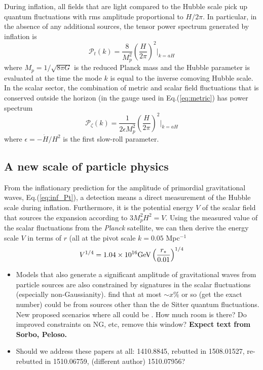 During inflation, all fields that are light compared to the Hubble scale pick up quantum fluctuations with rms amplitude proportional to $H/2\pi$. In particular, in the absence of any additional sources, the tensor power spectrum generated by inflation is 
\begin{equation}
\label{eq:inf_Pt}
\mathcal{P}_{t}(k)=\frac{8}{M_p^2}\left(\frac{H}{2\pi}\right)^2\big|_{k=aH}
\end{equation}
where $M_p=1/\sqrt{8\pi G}$ is the reduced Planck mass and the Hubble parameter is evaluated at the time the mode $k$ is equal to the inverse comoving Hubble scale. In the scalar sector, the combination of metric and scalar field fluctuations that is conserved outside the horizon (in the gauge used in Eq.(\ref{eq:metric}) has power spectrum
\begin{equation}
\label{eq:inf_Pzeta}
\mathcal{P}_{\zeta}(k)=\frac{1}{2\epsilon M_p^2}\left(\frac{H}{2\pi}\right)^2\big|_{k=aH}
\end{equation}
where $\epsilon=-\dot{H}/H^2$ is the first slow-roll parameter. 



\subsection{A new scale of particle physics}
\label{sec:scale-of-inflation}
From the inflationary prediction for the amplitude of primordial gravitational waves, Eq.(\ref{eq:inf_Pt}), a detection means a direct measurement of the Hubble scale during inflation. Furthermore, it is the potential energy $V$ of the scalar field that sources the expansion according to $3M_p^2H^2=V$. Using the measured value of the scalar fluctuations from the {\it Planck} satellite, we can then derive the energy scale $V$ in terms of $r$ (all at the pivot scale $k=0.05$ Mpc$^{-1}$
\begin{equation}
V^{1/4}=1.04\times 10^{16}{\rm GeV}\left(\frac{r_*}{0.01}\right)^{1/4}
\end{equation}



\begin{itemize}
\item Models that also generate a significant amplitude of gravitational waves from particle sources are also constrained by signatures in the scalar fluctuations (especially non-Gaussianity). \cite{Mirbabayi:2014jqa, Ozsoy:2014sba} find that at most $\sim x\%$ or so (get the exact number) could be from sources other than the de Sitter quantum fluctuations. New proposed scenarios where all could be  \cite{Namba:2015gja}. How much room is there? Do improved constraints on NG, etc, remove this window? {\bf Expect text from Sorbo, Peloso.}
\item Should we address these papers at all: 1410.8845, rebutted in 1508.01527, re-rebutted in 1510.06759, (different author) 1510.07956?
\end{itemize}

